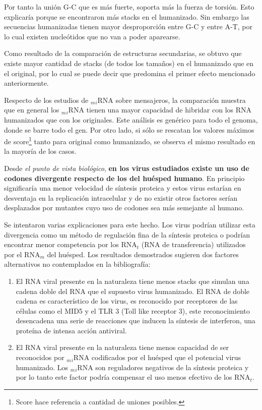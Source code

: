 \par Por tanto la unión G-C que es más fuerte, soporta más la fuerza de torsión. Esto explicaría porque se encontraron más stacks en el humanizado. Sin embargo las secuencias humanizadas tienen mayor desproporción entre G-C y entre A-T, por lo cual existen nucleótidos que no van a poder aparearse.

\par Como resultado de la comparación de estructuras secundarias, se obtuvo que existe mayor cantidad de stacks (de todos los tamaños) en el humanizado que en el original, por lo cual se puede decir que predomina el primer efecto mencionado anteriormente.

\par Respecto de los estudios de $_m$$_i$RNA sobre mensajeros, la comparación muestra que en general los $_m$$_i$RNA tienen una mayor capacidad de hibridar con los RNA humanizados que con los originales. Este análisis es genérico para todo el genoma, donde se barre todo el gen. Por otro lado, si sólo se rescatan los valores máximos de score\footnote{Score hace referencia a cantidad de uniones posibles.} tanto para original como humanizado, se observa el mismo resultado en la mayoría de los casos.

\par Desde \emph{el punto de vista biológico}, \textbf{en los virus estudiados existe un uso de codones divergente respecto de los del huésped humano}. En principio significaría una menor velocidad de síntesis proteica y estos virus estarían en desventaja en la replicación intracelular y de no existir otros factores serían desplazados por mutantes cuyo uso de codones sea más semejante al humano.

\par Se intentaron varias explicaciones para este hecho. Los virus podrían utilizar esta divergencia como un método de regulación fina de la síntesis proteica o podrían encontrar menor competencia por los RNA$_t$ (RNA de transferencia) utilizados por el RNA$_m$ del huésped. Los resultados demostrados sugieren dos factores alternativos no contemplados en la bibliografía:

\begin{enumerate}
\item El RNA viral presente en la naturaleza tiene menos stacks que simulan una cadena doble del RNA que el supuesto virus humanizado. El RNA de doble cadena es característico de los virus, es reconocido por receptores de las células como el MID5 y el TLR 3  (Toll like receptor 3), este reconocimiento desencadena una serie de reacciones que inducen la síntesis de interferon, una proteína de intensa acción antiviral.

\item El RNA viral presente en la naturaleza tiene menos capacidad de ser reconocidos por $_m$$_i$RNA codificados por el huésped que el potencial virus humanizado. Los $_m$$_i$RNA son reguladores negativos de la síntesis proteica y por lo tanto este factor podría compensar el uso menos efectivo de los RNA$_t$.
\end{enumerate}

